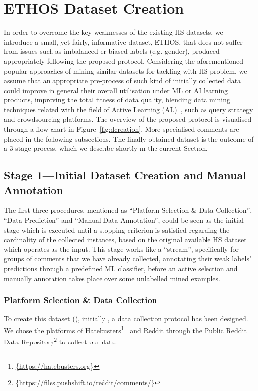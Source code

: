 \documentclass[sigconf]{acmart}
\begin{document}
\section{ETHOS Dataset Creation}
In order to overcome the key weaknesses of the existing HS datasets, we introduce a small, yet fairly, informative dataset, ETHOS, that does not suffer from issues such as imbalanced or biased labels (e.g. gender), produced appropriately following the proposed protocol. Considering the aforementioned popular approaches of mining similar datasets for tackling with HS problem, we assume that an appropriate pre-process of such kind of initially collected data could improve in general their overall utilisation under ML or AI learning products, improving the total fitness of data quality, blending data mining techniques related with the field of Active Learning (AL)~\cite{bonwell1991active}, such as query strategy and crowdsourcing platforms. The overview of the proposed protocol is visualised through a flow chart in Figure~\ref{fig:dcreation}. More specialised comments are placed in the following subsections. The finally obtained dataset is the outcome of a 3-stage process, which we describe shortly in the current Section.

\subsection{Stage 1---Initial Dataset Creation and Manual Annotation}
The first three procedures, mentioned as ``Platform Selection \& Data Collection'', ``Data Prediction'' and ``Manual Data Annotation'', could be seen as the initial stage which is executed until a stopping criterion is satisfied regarding the cardinality of the collected instances, based on the original available HS dataset which operates as the input. This stage works like a ``stream'', specifically for groups of comments that we have already collected, annotating their weak labels' predictions through a predefined ML classifier, before an active selection and manually annotation takes place over some unlabelled  mined examples.

\subsubsection{Platform Selection \& Data Collection}
To create this dataset (), initially , a data collection protocol has been designed. We chose the platforms of Hatebusters\footnote{\url{{https://hatebusters.org}}}~\cite{hatebusters} and Reddit through the Public Reddit Data Repository\footnote{\url{{https://files.pushshift.io/reddit/comments/}}} to collect our data. 
\end{document}
